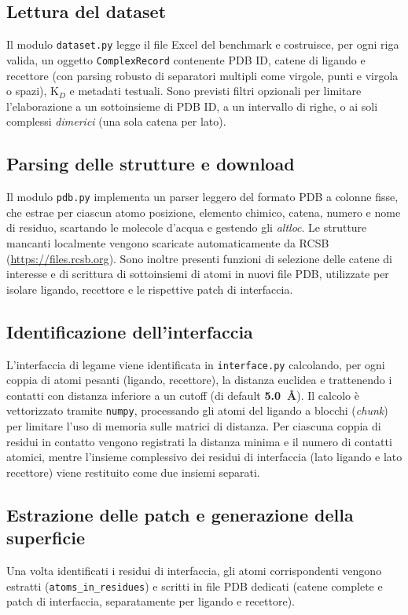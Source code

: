 \documentclass[11pt,a4paper]{article}
\begin{document}
\subsection{Lettura del dataset}
Il modulo \texttt{dataset.py} legge il file Excel del benchmark e costruisce, per ogni riga valida, un oggetto \texttt{ComplexRecord} contenente PDB ID, catene di ligando e recettore (con parsing robusto di separatori multipli come virgole, punti e virgola o spazi), K$_D$ e metadati testuali. Sono previsti filtri opzionali per limitare l'elaborazione a un sottoinsieme di PDB ID, a un intervallo di righe, o ai soli complessi \emph{dimerici} (una sola catena per lato).

\subsection{Parsing delle strutture e download}
Il modulo \texttt{pdb.py} implementa un parser leggero del formato PDB a colonne fisse, che estrae per ciascun atomo posizione, elemento chimico, catena, numero e nome di residuo, scartando le molecole d'acqua e gestendo gli \emph{altloc}. Le strutture mancanti localmente vengono scaricate automaticamente da RCSB (\url{https://files.rcsb.org}). Sono inoltre presenti funzioni di selezione delle catene di interesse e di scrittura di sottoinsiemi di atomi in nuovi file PDB, utilizzate per isolare ligando, recettore e le rispettive patch di interfaccia.

\subsection{Identificazione dell'interfaccia}
\label{sec:interface}
L'interfaccia di legame viene identificata in \texttt{interface.py} calcolando, per ogni coppia di atomi pesanti (ligando, recettore), la distanza euclidea e trattenendo i contatti con distanza inferiore a un cutoff (di default \textbf{5.0~\r{A}}). Il calcolo è vettorizzato tramite \texttt{numpy}, processando gli atomi del ligando a blocchi (\emph{chunk}) per limitare l'uso di memoria sulle matrici di distanza. Per ciascuna coppia di residui in contatto vengono registrati la distanza minima e il numero di contatti atomici, mentre l'insieme complessivo dei residui di interfaccia (lato ligando e lato recettore) viene restituito come due insiemi separati.

\subsection{Estrazione delle patch e generazione della superficie}
Una volta identificati i residui di interfaccia, gli atomi corrispondenti vengono estratti (\texttt{atoms\_in\_residues}) e scritti in file PDB dedicati (catene complete e patch di interfaccia, separatamente per ligando e recettore).
\end{document}

